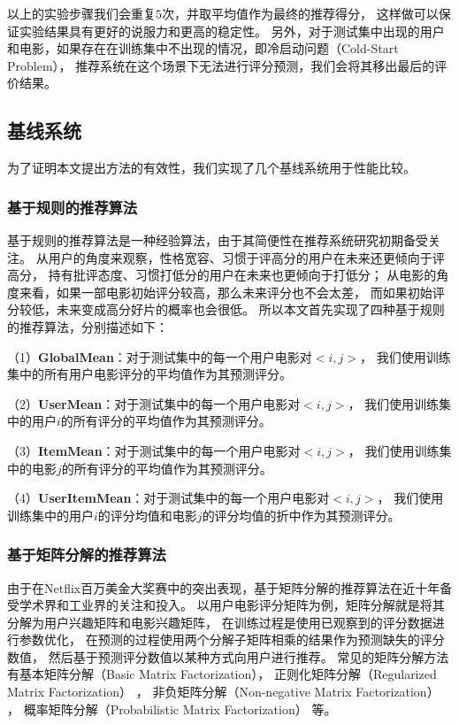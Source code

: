 以上的实验步骤我们会重复$5$次，并取平均值作为最终的推荐得分，
这样做可以保证实验结果具有更好的说服力和更高的稳定性。
另外，对于测试集中出现的用户和电影，如果存在在训练集中不出现的情况，即冷启动问题（Cold-Start Problem），
推荐系统在这个场景下无法进行评分预测，我们会将其移出最后的评价结果。

\subsection{基线系统}
为了证明本文提出方法的有效性，我们实现了几个基线系统用于性能比较。

\subsubsection{基于规则的推荐算法}
基于规则的推荐算法是一种经验算法，由于其简便性在推荐系统研究初期备受关注。
从用户的角度来观察，性格宽容、习惯于评高分的用户在未来还更倾向于评高分，
持有批评态度、习惯打低分的用户在未来也更倾向于打低分；
从电影的角度来看，如果一部电影初始评分较高，那么未来评分也不会太差，
而如果初始评分较低，未来变成高分好片的概率也会很低。
所以本文首先实现了四种基于规则的推荐算法，分别描述如下：

（1）\textbf{GlobalMean}：对于测试集中的每一个用户电影对$<i, j>$，
我们使用训练集中的所有用户电影评分的平均值作为其预测评分。

（2）\textbf{UserMean}：对于测试集中的每一个用户电影对$<i, j>$，
我们使用训练集中的用户$i$的所有评分的平均值作为其预测评分。

（3）\textbf{ItemMean}：对于测试集中的每一个用户电影对$<i, j>$，
我们使用训练集中的电影$j$的所有评分的平均值作为其预测评分。

（4）\textbf{UserItemMean}：对于测试集中的每一个用户电影对$<i, j>$，
我们使用训练集中的用户$i$的评分均值和电影$j$的评分均值的折中作为其预测评分。

\subsubsection{基于矩阵分解的推荐算法}
由于在Netflix百万美金大奖赛中的突出表现，基于矩阵分解的推荐算法在近十年备受学术界和工业界的关注和投入。
以用户电影评分矩阵为例，矩阵分解就是将其分解为用户兴趣矩阵和电影兴趣矩阵，
在训练过程是使用已观察到的评分数据进行参数优化，
在预测的过程使用两个分解子矩阵相乘的结果作为预测缺失的评分数值，
然后基于预测评分数值以某种方式向用户进行推荐。
常见的矩阵分解方法有基本矩阵分解（Basic Matrix Factorization），
正则化矩阵分解（Regularized Matrix Factorization）
\parencite{koren2009matrix}，
非负矩阵分解（Non-negative Matrix Factorization）
\parencite{lee2001algorithms}，
概率矩阵分解（Probabilistic Matrix Factorization）
\parencite{salakhutdinov2007probabilistic}等。

